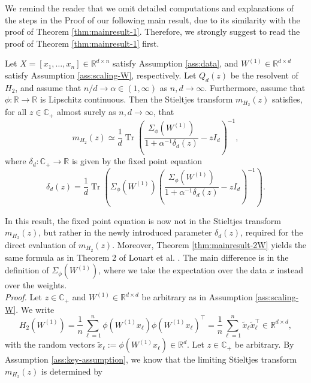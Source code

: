 \documentclass{article}
\begin{document}
\bigskip
\par
We remind the reader that we omit detailed computations and explanations of the steps in the Proof of our following main result, due to its similarity with the proof of Theorem \ref{thm:mainresult-1}. Therefore, we strongly suggest to read the proof of Theorem \ref{thm:mainresult-1} first.
\bigskip
\begin{theorem}
Let $X=[x_1,\dots,x_n]\in\mathbb{R}^{d\times n}$ satisfy Assumption \ref{ass:data}, and $W^{(1)}\in\mathbb{R}^{d\times d}$ satisfy Assumption \ref{ass:scaling-W}, respectively. Let $Q_d(z)$ be the resolvent of $H_2$, and assume that $n/d\to\alpha\in(1,\infty)$ as $n,d\to\infty$. Furthermore, assume that $\phi:\mathbb{R}\to\mathbb{R}$ is Lipschitz continuous. Then the Stieltjes transform $m_{H_2}(z)$ satisfies, for all $z\in\mathbb{C}_+$ almost surely as $n,d\to\infty$, that
\begin{equation*}
m_{H_2}(z)\simeq\frac{1}{d}\operatorname{Tr}\left(\frac{\Sigma_\phi(W^{(1)})}{1+\alpha^{-1}\delta_d(z)}-zI_d\right)^{-1},
\end{equation*}
where $\delta_d:\mathbb{C}_+\to\mathbb{R}$ is given by the fixed point equation
\begin{equation}
\delta_d(z)=\frac{1}{d}\operatorname{Tr}\left(\Sigma_\phi(W^{(1)})\left(\frac{\Sigma_\phi(W^{(1)})}{1+\alpha^{-1}\delta_d(z)}-zI_d\right)^{-1}\right).
\end{equation} \label{thm:mainresult-2W}
\end{theorem}
\bigskip
In this result, the fixed point equation is now not in the Stieltjes transform $m_{H_2}(z)$, but rather in the newly introduced parameter $\delta_d(z)$, required for the direct evaluation of $m_{H_2}(z)$. Moreover, Theorem \ref{thm:mainresult-2W} yields the same formula as in Theorem 2 of Louart et al. \cite{louart}. The main difference is in the definition of $\Sigma_\phi(W^{(1)})$, where we take the expectation over the data $x$ instead over the weights.
\bigskip
\\
\emph{Proof.} Let $z\in\mathbb{C}_+$ and $W^{(1)}\in\mathbb{R}^{d\times d}$ be arbitrary as in Assumption \ref{ass:scaling-W}. We write
\begin{equation}
H_2(W^{(1)})=\frac{1}{n}\sum_{\ell=1}^n\phi(W^{(1)}x_\ell)\phi(W^{(1)}x_\ell)^\top=\frac{1}{n}\sum_{\ell=1}^n\tilde{x}_\ell\tilde{x}_\ell^\top\in\mathbb{R}^{d\times d},
\end{equation}
with the random vectors $\tilde{x}_\ell:=\phi(W^{(1)}x_\ell)\in\mathbb{R}^{d}$. Let $z\in\mathbb{C}_+$ be arbitrary. By Assumption \ref{ass:key-assumption}, we know that the limiting Stieltjes transform $m_{H_2}(z)$ is determined by
\end{document}
